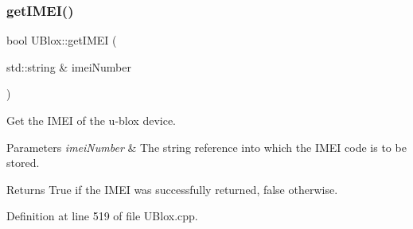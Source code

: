 \subsubsection{\texorpdfstring{get\+I\+M\+E\+I()}{getIMEI()}}
{\footnotesize\ttfamily bool U\+Blox\+::get\+I\+M\+EI (\begin{DoxyParamCaption}\item[{std\+::string \&}]{imei\+Number }\end{DoxyParamCaption})}

Get the I\+M\+EI of the u-\/blox device.


\begin{DoxyParams}{Parameters}
{\em imei\+Number} & The string reference into which the I\+M\+EI code is to be stored. \\
\hline
\end{DoxyParams}
\begin{DoxyReturn}{Returns}
True if the I\+M\+EI was successfully returned, false otherwise. 
\end{DoxyReturn}


Definition at line 519 of file U\+Blox.\+cpp.


